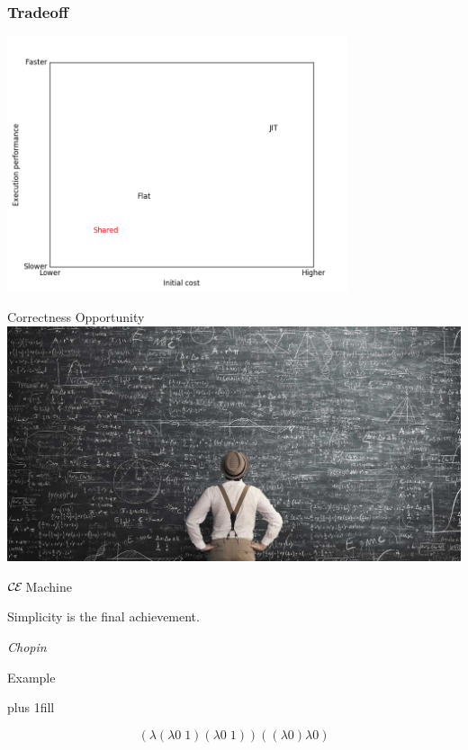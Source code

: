 \documentclass[14pt,mathserif]{beamer}
\def\ce{$\mathcal{\mathcal{C} \mskip -1mu \mathcal{E}} \mskip 4mu$}
\newcommand{\sectionslide}[3]{
  \begin{frame}
  \vspace{1cm}
  \vfill
  {\usebeamerfont{title} \color{red} #1}
  \vfill
  \epigraph{\footnotesize{#2}}{\footnotesize{\emph{#3}}}
  \end{frame}}
\begin{document}
\begin{frame}[fragile]
\frametitle{Tradeoff}
\begin{center}
\includegraphics[width=10cm]{tradeoffplot}
\end{center}
\end{frame}

\begin{frame}[fragile]{Correctness Opportunity}
\centering
\includegraphics[width=0.8\paperwidth]{equation-chalkboard.jpg}
\end{frame}

\sectionslide{\ce Machine}
{Simplicity is the final achievement.}
{Chopin}

\begin{frame}{Example}
\begin{center}
\vskip0pt plus 1fill
\end{center}
$$(\lambda (\lambda 0 \; 1) (\lambda 0 \; 1))((\lambda 0) \lambda 0)$$
\end{frame}
\end{document}
